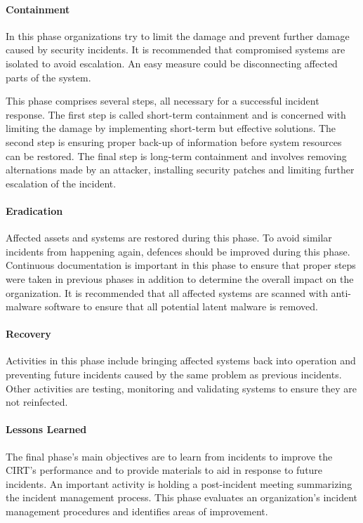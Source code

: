 \paragraph{Containment} 
In this phase organizations try to limit the damage and prevent further damage caused by security incidents. It is recommended that compromised systems are isolated to avoid escalation. An easy measure could be disconnecting affected parts of the system. 

This phase comprises several steps, all necessary for a successful incident response. The first step is called short-term containment and is concerned with limiting the damage by implementing short-term but effective solutions. The second step is ensuring proper back-up of information before system resources can be restored. The final step is long-term containment and involves removing alternations made by an attacker, installing security patches and limiting further escalation of the incident.

\paragraph{Eradication} 
Affected assets and systems are restored during this phase. To avoid similar incidents from happening again, defences should be improved during this phase. Continuous documentation is important in this phase to ensure that proper steps were taken in previous phases in addition to determine the overall impact on the organization. It is recommended that all affected systems are scanned with anti-malware software to ensure that all potential latent malware is removed. 

\paragraph{Recovery} 
Activities in this phase include bringing affected systems back into operation and preventing future incidents caused by the same problem as previous incidents. Other activities are testing, monitoring and validating systems to ensure they are not reinfected. 

\paragraph{Lessons Learned} 
The final phase's main objectives are to learn from incidents to improve the CIRT's performance and to provide materials to aid in response to future incidents. An important activity is holding a post-incident meeting summarizing the incident management process. This phase evaluates an organization's incident management procedures and identifies areas of improvement.